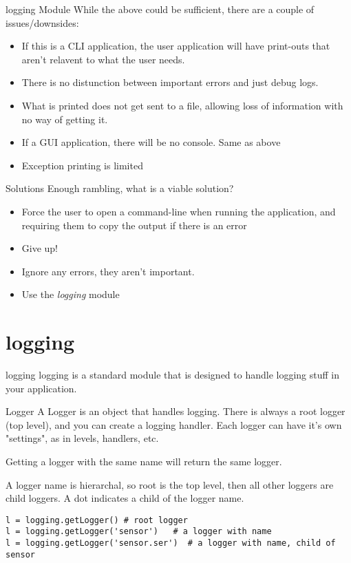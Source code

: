 \begin{frame}{logging Module}
  While the above could be sufficient, there are a couple of issues/downsides:
  \begin{itemize}
    \item If this is a CLI application, the user application will have print-outs that aren't relavent to what the user needs.
    \item There is no distunction between important errors and just debug logs.
    \item What is printed does not get sent to a file, allowing loss of information with no way of getting it.
    \item If a GUI application, there will be no console. Same as above
    \item Exception printing is limited
  \end{itemize}
\end{frame}

\begin{frame}{Solutions}
  Enough rambling, what is a viable solution?\pause
  \begin{itemize}
    \item Force the user to open a command-line when running the application, and requiring them to copy the output if there is an error\pause
    \item Give up!\pause
    \item Ignore any errors, they aren't important.\pause
    \item Use the \textit{logging} module
  \end{itemize}
\end{frame}

\section{logging}

\begin{frame}{logging}
  logging is a standard module that is designed to handle logging stuff in your application.
\end{frame}

\begin{frame}[containsverbatim]{Logger}
  A Logger is an object that handles logging. There is always a root logger (top level), and you can create a logging handler. Each logger can have it's own "settings", as in levels, handlers, etc.

  Getting a logger with the same name will return the same logger.

  A logger name is hierarchal, so root is the top level, then all other loggers are child loggers. A dot indicates a child of the logger name.
  \begin{verbatim}
l = logging.getLogger() # root logger
l = logging.getLogger('sensor')   # a logger with name
l = logging.getLogger('sensor.ser')  # a logger with name, child of sensor
\end{verbatim}
\end{frame}

